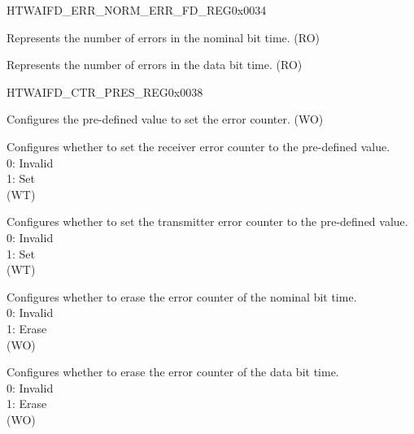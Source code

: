 \begin{register}{H}{TWAIFD\_ERR\_NORM\_ERR\_FD\_REG}{0x0034}\label{regdesc:TWAIFDERRNORMERRFDREG}
%
%
\regnewline%
\begin{regdesc}\begin{reglist}
\label{fielddesc:TWAIFDERRNORMVAL}\item [TWAIFD\_ERR\_NORM\_VAL] Represents the number of errors in the nominal bit time. (RO)
\label{fielddesc:TWAIFDERRFDVAL}\item [TWAIFD\_ERR\_FD\_VAL] Represents the number of errors in the data bit time. (RO)
\end{reglist}\end{regdesc}
\end{register}


\begin{register}{H}{TWAIFD\_CTR\_PRES\_REG}{0x0038}\label{regdesc:TWAIFDCTRPRESREG}
%
%
%
%
%
%
\regnewline%
\begin{regdesc}\begin{reglist}
\label{fielddesc:TWAIFDCTPV}\item [TWAIFD\_CTPV] Configures the pre-defined value to set the error counter. (WO)
\label{fielddesc:TWAIFDPTX}\item [TWAIFD\_PTX] Configures whether to set the receiver error counter to the pre-defined value.\\
0: Invalid\\
1: Set\\(WT)
\label{fielddesc:TWAIFDPRX}\item [TWAIFD\_PRX] Configures whether to set the transmitter error counter to the pre-defined value.\\
0: Invalid\\
1: Set\\(WT)
\label{fielddesc:TWAIFDENORM}\item [TWAIFD\_ENORM] Configures whether to erase the error counter of the nominal bit time.\\
0: Invalid\\
1: Erase\\(WO)
\label{fielddesc:TWAIFDEFD}\item [TWAIFD\_EFD] Configures whether to erase the error counter of the data bit time.\\
0: Invalid\\
1: Erase\\(WO)
\end{reglist}\end{regdesc}
\end{register}


